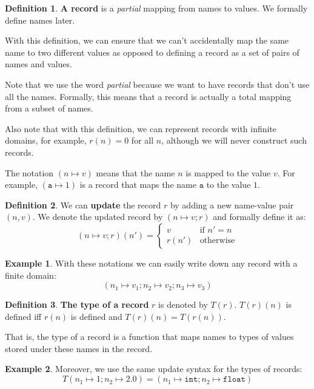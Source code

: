 \documentclass[14pt]{constructor-thesis}
\theoremstyle{definition}
\newtheorem{definition}{Definition}
\newtheorem{example}{Example}
\begin{document}
\begin{definition}
  \textbf{A record} is a \textit{partial} mapping from names to values. We formally define names later.
\end{definition}

With this definition, we can ensure that we can't accidentally map the same name to two different values as opposed to defining a record as a set of pairs of names and values.

Note that we use the word \textit{partial} because we want to have records that don't use all the names. Formally, this means that a record is actually a total mapping from a subset of names.

Also note that with this definition, we can represent records with infinite domains, for example, $r(n) = 0$ for all $n$, although we will never construct such records.

The notation $(n \mapsto v)$ means that the name $n$ is mapped to the value $v$. For example, $(\mathtt{a} \mapsto 1)$ is a record that maps the name $\mathtt{a}$ to the value $1$.

\begin{definition}
  We can \textbf{update} the record $r$ by adding a new name-value pair $(n, v)$. We denote the updated record by $(n \mapsto v; r)$ and formally define it as:
  $$
  (n \mapsto v; r)(n') = \begin{cases}
    v & \text{if } n' = n \\
    r(n') & \text{otherwise}
  \end{cases}
  $$
\end{definition}

\begin{example}
  With these notations we can easily write down any record with a finite domain:
  $$(n_1 \mapsto v_1; n_2 \mapsto v_2; n_3 \mapsto v_3)$$
\end{example}

\begin{definition}
  \textbf{The type of a record} $r$ is denoted by $T(r)$. $T(r)(n)$ is defined iff $r(n)$ is defined and $T(r)(n) = T(r(n))$.
\end{definition}

That is, the type of a record is a function that maps names to types of values stored under these names in the record. 

\begin{example} Moreover, we use the same update syntax for the types of records:
  $$T(n_1 \mapsto 1; n_2 \mapsto 2.0) = (n_1 \mapsto \mathtt{int}; n_2 \mapsto \mathtt{float})$$
\end{example}
\end{document}
